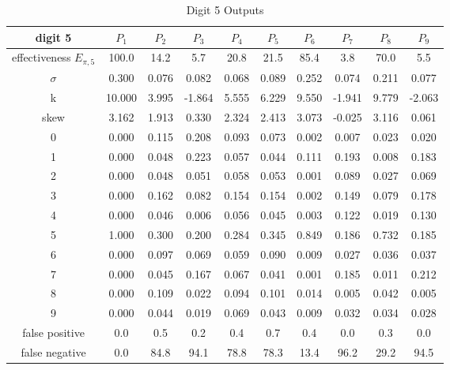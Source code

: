 \documentclass[conference]{IEEEtran}
\begin{document}
\begin{table}
\caption{Digit 5 Outputs}
\centering\begin{tabular}{ | c ||  c | c | c | c | c | c | c | c | c |}
 digit 5 & $P_1$ & $P_2$ & $P_3$ & $P_4$ & $P_5$ & $P_6$ & $P_7$ & $P_8$ & $P_9$ \\
\hline \hline
effectiveness $E_{\pi,5}$  & 100.0 & 14.2 & 5.7 & 20.8 & 21.5 & 85.4 & 3.8 & 70.0 & 5.5 \\
\hline
$\sigma$ & 0.300& 0.076& 0.082& 0.068& 0.089& 0.252& 0.074& 0.211& 0.077 \\
\hline
k & 10.000& 3.995& -1.864& 5.555& 6.229& 9.550& -1.941& 9.779& -2.063 \\
\hline
skew & 3.162& 1.913& 0.330& 2.324& 2.413& 3.073& -0.025& 3.116& 0.061 \\
\hline
0 & 0.000 & 0.115 & 0.208 & 0.093 & 0.073 & 0.002 & 0.007 & 0.023 & 0.020 \\
\hline
1 & 0.000 & 0.048 & 0.223 & 0.057 & 0.044 & 0.111 & 0.193 & 0.008 & 0.183 \\
\hline
2 & 0.000 & 0.048 & 0.051 & 0.058 & 0.053 & 0.001 & 0.089 & 0.027 & 0.069 \\
\hline
3 & 0.000 & 0.162 & 0.082 & 0.154 & 0.154 & 0.002 & 0.149 & 0.079 & 0.178 \\
\hline
4 & 0.000 & 0.046 & 0.006 & 0.056 & 0.045 & 0.003 & 0.122 & 0.019 & 0.130 \\
\hline
5 & 1.000 & 0.300 & 0.200 & 0.284 & 0.345 & 0.849 & 0.186 & 0.732 & 0.185 \\
\hline
6 & 0.000 & 0.097 & 0.069 & 0.059 & 0.090 & 0.009 & 0.027 & 0.036 & 0.037 \\
\hline
7 & 0.000 & 0.045 & 0.167 & 0.067 & 0.041 & 0.001 & 0.185 & 0.011 & 0.212 \\
\hline
8 & 0.000 & 0.109 & 0.022 & 0.094 & 0.101 & 0.014 & 0.005 & 0.042 & 0.005 \\
\hline
9 & 0.000 & 0.044 & 0.019 & 0.069 & 0.043 & 0.009 & 0.032 & 0.034 & 0.028 \\
\hline
false positive  & 0.0 & 0.5 & 0.2 & 0.4 & 0.7 & 0.4 & 0.0 & 0.3 & 0.0 \\
\hline
false negative  & 0.0 & 84.8 & 94.1 & 78.8 & 78.3 & 13.4 & 96.2 & 29.2 & 94.5 \\
\hline
\end{tabular}
\label{table:digit5out}
\end{table}
\end{document}
